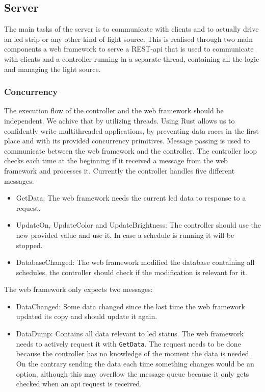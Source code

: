 \documentclass[conference]{IEEEtran}
\begin{document}
\subsection{Server}
The main tasks of the server is to communicate with clients and to actually drive an led strip or any other kind of light source.
This is realised through two main components a web framework to serve a REST-api that is used to communicate with clients and a
controller running in a separate thread, containing all the logic and managing the light source.

\subsubsection{Concurrency}
The execution flow of the controller and the web framework should be independent. We achive that by utilizing threads. Using Rust
allows us to confidently write multithreaded applications\cite{rust:con}, by preventing data races in the first place and with its
provided concurrency primitives. Message passing is used to communicate between the web framework and the controller. The controller
loop checks each time at the beginning if it received a message from the web framework and processes it. Currently the
controller handles five different messages:

\begin{itemize}
   \item GetData:
   The web framework needs the current led data to response to a request.
   \item UpdateOn, UpdateColor and UpdateBrightness:
   The controller should use the new provided value and use it. In case a schedule is running it will be stopped.
   \item DatabaseChanged:
   The web framework modified the database containing all schedules, the controller should check if the modification is relevant
   for it.
\end{itemize}

The web framework only expects two messages:
\begin{itemize}
   \item DataChanged:
   Some data changed since the last time the web framework updated its copy and should update it again.
   \item DataDump:
   Contains all data relevant to led status. The web framework needs to actively request it with \texttt{GetData}. 
   The request needs to be done because the controller has no knowledge of the moment the data is needed. On the contrary
   sending the data each time something changes would be an option, although this may overflow the message queue because
   it only gets checked when an api request is received. 
\end{itemize}
\end{document}
